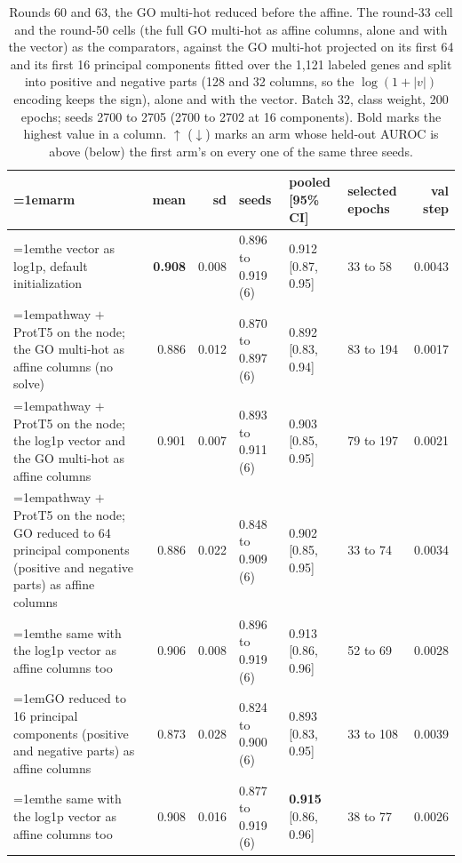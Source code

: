 \begin{table}[H]
  \centering
  \scriptsize
  \setlength{\tabcolsep}{2.5pt}
  \caption[Rounds 60 and 63, the GO multi-hot reduced before the affine]{Rounds 60 and 63, the GO multi-hot reduced before the affine. The round-33 cell and the round-50 cells (the full GO multi-hot as affine columns, alone and with the vector) as the comparators, against the GO multi-hot projected on its first 64 and its first 16 principal components fitted over the 1,121 labeled genes and split into positive and negative parts (128 and 32 columns, so the $\log(1 + |v|)$ encoding keeps the sign), alone and with the vector. Batch 32, class weight, 200 epochs; seeds 2700 to 2705 (2700 to 2702 at 16 components). Bold marks the highest value in a column. $\uparrow$ ($\downarrow$) marks an arm whose held-out AUROC is above (below) the first arm's on every one of the same three seeds.}
  \label{tab:w76}
  \begin{tabular}{@{}>{\raggedright\hangindent=1em\hangafter=1\arraybackslash}p{84.4mm}rrlllr@{}}
    \hline
    arm & mean & sd & seeds & pooled [95\% CI] & selected epochs & val step \\
    \hline
    the vector as log1p, default initialization & \textbf{0.908} & 0.008 & 0.896 to 0.919 (6) & 0.912 [0.87, 0.95] & 33 to 58 & 0.0043 \\
    pathway $+$ ProtT5 on the node; the GO multi-hot as affine columns (no solve) & 0.886 & 0.012 & 0.870 to 0.897 (6) & 0.892 [0.83, 0.94] & 83 to 194 & 0.0017 \\
    pathway $+$ ProtT5 on the node; the log1p vector and the GO multi-hot as affine columns & 0.901 & 0.007 & 0.893 to 0.911 (6) & 0.903 [0.85, 0.95] & 79 to 197 & 0.0021 \\
    pathway $+$ ProtT5 on the node; GO reduced to 64 principal components (positive and negative parts) as affine columns & 0.886 & 0.022 & 0.848 to 0.909 (6) & 0.902 [0.85, 0.95] & 33 to 74 & 0.0034 \\
    the same with the log1p vector as affine columns too & 0.906 & 0.008 & 0.896 to 0.919 (6) & 0.913 [0.86, 0.96] & 52 to 69 & 0.0028 \\
    GO reduced to 16 principal components (positive and negative parts) as affine columns & 0.873 & 0.028 & 0.824 to 0.900 (6) & 0.893 [0.83, 0.95] & 33 to 108 & 0.0039 \\
    the same with the log1p vector as affine columns too & 0.908 & 0.016 & 0.877 to 0.919 (6) & \textbf{0.915} [0.86, 0.96] & 38 to 77 & 0.0026 \\
    \hline
  \end{tabular}
\end{table}
